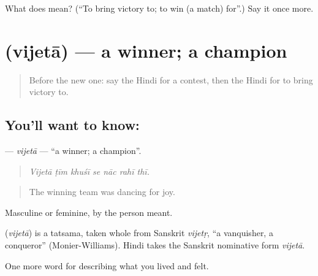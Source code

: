 \begin{tcolorbox}[breakable,colback=teal!4,colframe=teal!35!black,title={Before you move on}]
What does  mean? (\textquotedblleft{}To bring victory to; to win (a match) for\textquotedblright{}.) Say it once more.
\end{tcolorbox}
\section[\texorpdfstring{\hi{विजेता} (vijetā)}{विजेता (vijetā)}]{ (vijetā) — a winner; a champion}

\label{lesson:HI-C534-vijeta}



\begin{quote}
Before the new one: say the Hindi for a contest, then the Hindi for to bring victory to.
\end{quote}

\subsection*{You'll want to know: }
\textbf{} — \emph{vijetā} — \textquotedblleft{}a winner; a champion\textquotedblright{}.

\begin{quote}
      
\end{quote}

\begin{quote}
\emph{Vijetā ṭīm khuśī se nāc rahī thī.}
\end{quote}

\begin{quote}
The winning team was dancing for joy.
\end{quote}

Masculine or feminine, by the person meant.

\begin{cousinweb}
\textbf{} (\emph{vijetā}) is a tatsama, taken whole from Sanskrit \emph{vijetṛ}, \textquotedblleft{}a vanquisher, a conqueror\textquotedblright{} (Monier-Williams). Hindi takes the Sanskrit nominative form \emph{vijetā}.
\end{cousinweb}

\begin{grammarlens}[title={What you've built}]
One more word for describing what you lived and felt.
\end{grammarlens}

